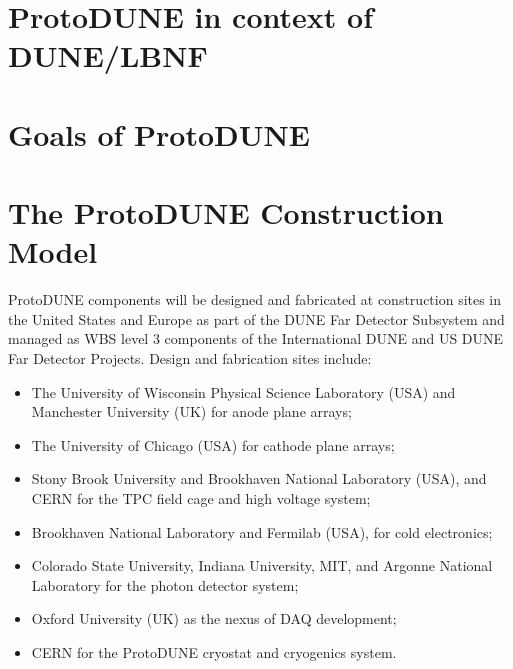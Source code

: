 
\label{chapter-intro}

\section{ProtoDUNE in context of DUNE/LBNF}
\label{intro:context}


\section{Goals of ProtoDUNE}
\label{intro:goals}

\section{The ProtoDUNE Construction Model}
\label{intro:const-model}


ProtoDUNE components will be designed and fabricated at construction sites in
the United States and Europe as part of the DUNE Far Detector Subsystem and
managed as WBS level 3 components of the International DUNE and US DUNE Far
Detector Projects.  Design and fabrication sites include:

\begin{itemize}
\item The University of Wisconsin Physical Science Laboratory (USA) and
Manchester University (UK) for anode plane arrays;

\item The University of Chicago (USA) for cathode plane arrays;

\item Stony Brook University and Brookhaven National Laboratory (USA), and
CERN for the TPC field cage and high voltage system;

\item Brookhaven National Laboratory and Fermilab (USA), for cold electronics;

\item Colorado State University, Indiana University, MIT, and Argonne National
Laboratory for the photon detector system;

\item Oxford University (UK) as the nexus of DAQ development;

\item CERN for the ProtoDUNE cryostat and cryogenics system.
\end{itemize}

